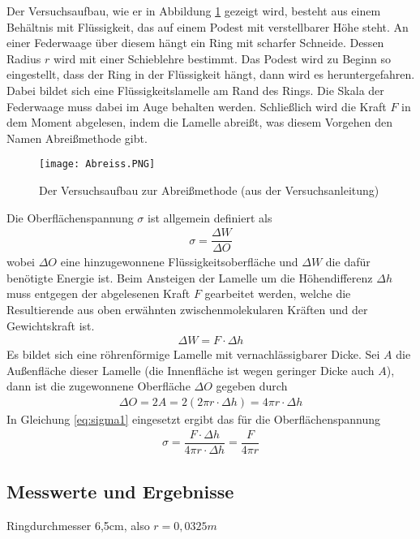 \documentclass{scrartcl}
\begin{document}
Der Versuchsaufbau, wie er in Abbildung \ref{fig:Abreiss} gezeigt wird, besteht aus einem Behältnis mit Flüssigkeit, das auf einem Podest mit verstellbarer Höhe steht. An einer Federwaage über diesem hängt ein Ring mit scharfer Schneide. Dessen Radius $r$ wird mit einer Schieblehre bestimmt. Das Podest wird zu Beginn so eingestellt, dass der Ring in der Flüssigkeit hängt, dann wird es heruntergefahren. Dabei bildet sich eine Flüssigkeitslamelle am Rand des Rings. Die Skala der Federwaage muss dabei im Auge behalten werden. Schließlich wird die Kraft $F$ in dem Moment abgelesen, indem die Lamelle abreißt, was diesem Vorgehen den Namen Abreißmethode gibt.

\begin{figure}[H]
  \centering
    \texttt{[image: Abreiss.PNG]}
  \caption{Der Versuchsaufbau zur Abreißmethode (aus der Versuchsanleitung)}
  \label{fig:Abreiss}
\end{figure}

Die Oberflächenspannung $\sigma$ ist allgemein definiert als
\begin{align}
\sigma = \dfrac{\Delta W}{\Delta O}
\label{eq:sigma1}
\end{align}
wobei $\Delta O$ eine hinzugewonnene Flüssigkeitsoberfläche und $\Delta W$ die dafür benötigte Energie ist.
Beim Ansteigen der Lamelle um die Höhendifferenz $\Delta h$ muss entgegen der abgelesenen Kraft $F$ gearbeitet werden, welche die Resultierende aus oben erwähnten zwischenmolekularen Kräften und der Gewichtskraft ist.
\begin{align}
\Delta W = F \cdot \Delta h
\end{align}
Es bildet sich eine röhrenförmige Lamelle mit vernachlässigbarer Dicke. Sei $A$ die Außenfläche dieser Lamelle (die Innenfläche ist wegen geringer Dicke auch $A$), dann ist die zugewonnene Oberfläche $\Delta O$ gegeben durch
\begin{align}
\Delta O = 2A = 2(2 \pi r \cdot \Delta h) = 4 \pi r \cdot \Delta h
\label{eq:delta_O}
\end{align}
In Gleichung \ref{eq:sigma1} eingesetzt ergibt das für die Oberflächenspannung
\begin{align}
\sigma = \dfrac{F \cdot \Delta h}{4 \pi r \cdot \Delta h} = \dfrac{F}{4 \pi r} \label{eq:sigma2}
\end{align}
\subsection{Messwerte und Ergebnisse}
Ringdurchmesser 6,5cm, also $r = 0,0325m$
\end{document}
